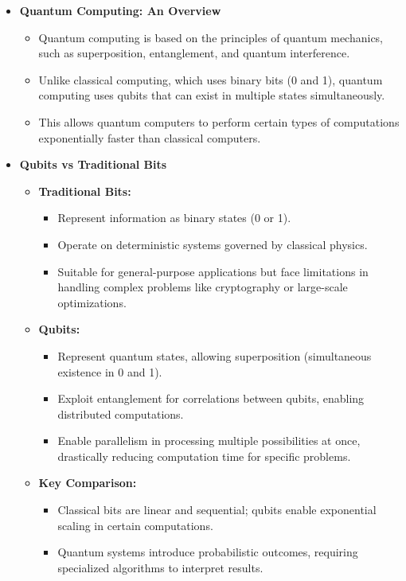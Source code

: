 \documentclass[12pt,a4paper]{article}
\begin{document}
\begin{itemize}
    \item \textbf{Quantum Computing: An Overview}
    \begin{itemize}
        \item Quantum computing is based on the principles of quantum mechanics, such as superposition, entanglement, and quantum interference.
        \item Unlike classical computing, which uses binary bits (0 and 1), quantum computing uses qubits that can exist in multiple states simultaneously.
        \item This allows quantum computers to perform certain types of computations exponentially faster than classical computers.
    \end{itemize}

    \item \textbf{Qubits vs Traditional Bits}
    \begin{itemize}
        \item \textbf{Traditional Bits:} 
        \begin{itemize}
            \item Represent information as binary states (0 or 1).
            \item Operate on deterministic systems governed by classical physics.
            \item Suitable for general-purpose applications but face limitations in handling complex problems like cryptography or large-scale optimizations.
        \end{itemize}
        \item \textbf{Qubits:} 
        \begin{itemize}
            \item Represent quantum states, allowing superposition (simultaneous existence in 0 and 1).
            \item Exploit entanglement for correlations between qubits, enabling distributed computations.
            \item Enable parallelism in processing multiple possibilities at once, drastically reducing computation time for specific problems.
        \end{itemize}
        \item \textbf{Key Comparison:}
        \begin{itemize}
            \item Classical bits are linear and sequential; qubits enable exponential scaling in certain computations.
            \item Quantum systems introduce probabilistic outcomes, requiring specialized algorithms to interpret results.
        \end{itemize}
    \end{itemize}


\end{itemize}
\end{document}
